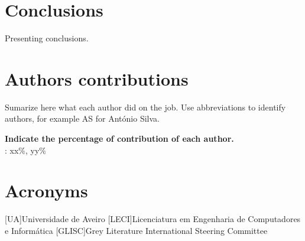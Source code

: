 \documentclass{report}
\begin{document}
\chapter{Conclusions}
\label{chap.conclusions}
Presenting conclusions.

\chapter*{Authors contributions}
Sumarize here what each author did on the job.
Use abbreviations to identify authors,
for example AS for António Silva.

\vspace{10pt}
\textbf{Indicate the percentage of contribution of each author.}\\

\authors : xx\%, yy\%\\

\chapter*{Acronyms}
\begin{acronym}
[UA]{Universidade de Aveiro}
[LECI]{Licenciatura em Engenharia de Computadores e Informática}
[GLISC]{Grey Literature International Steering Committee}
\end{acronym}


\printbibliography
\end{document}
